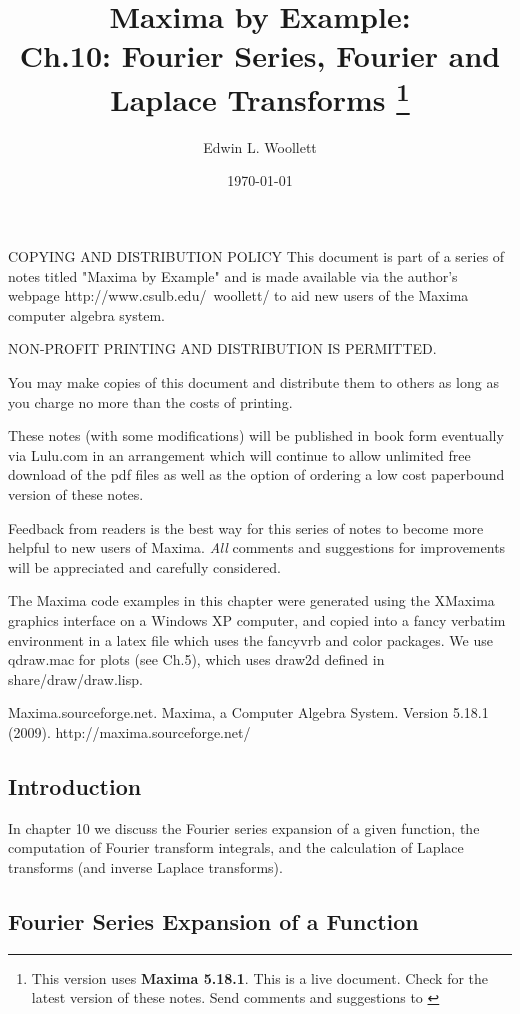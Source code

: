 \documentclass[12pt]{article}
\title{  Maxima by Example:\\ Ch.10: Fourier Series, Fourier and Laplace Transforms
            \thanks{This version uses \textbf{Maxima 5.18.1}. This is a live
            document. Check \; \textbf{ \tedhome } \; for the latest version of these notes. Send comments and
			 suggestions to \textbf{\tedmail} } }
\author{ Edwin L. Woollett}
\date{\today}
\newcommand{\tcdb}{\textcolor{mdb}}
\newcommand{\tcbr}{\textcolor{BrickRed}}
\begin{document}
%
\maketitle
\tableofcontents
{}
\newpage
\begin{myVerbatim2} 
COPYING AND DISTRIBUTION POLICY    
This document is part of a series of notes titled
"Maxima by Example" and is made available
via the author's webpage http://www.csulb.edu/~woollett/
to aid new users of the Maxima computer algebra system.	
	
NON-PROFIT PRINTING AND DISTRIBUTION IS PERMITTED.
	
You may make copies of this document and distribute them
to others as long as you charge no more than the costs of printing.	

These notes (with some modifications) will be published in book form
eventually via Lulu.com in an arrangement which will continue
to allow unlimited free download of the pdf files as well as the option
of ordering a low cost paperbound version of these notes.
\end{myVerbatim2}	
\smallskip
\noindent \tcbr{Feedback from readers is the best way for this series of notes
  to become more helpful to new users of Maxima}.
\tcdb{\emph{All} comments and suggestions for improvements will be appreciated and
  carefully considered}.
\smallskip
\begin{myVerbatim2s}
The Maxima code examples in this chapter were generated 
using the XMaxima graphics interface on a Windows XP computer, and copied
into a fancy verbatim environment in a latex file which uses the fancyvrb
and color packages.
We use qdraw.mac for plots (see Ch.5), which uses draw2d defined
in share/draw/draw.lisp.
\end{myVerbatim2s}  
\smallskip
\begin{myVerbatim}
Maxima.sourceforge.net. Maxima, a Computer Algebra System. Version 5.18.1
 (2009). http://maxima.sourceforge.net/
\end{myVerbatim}
\newpage
\setcounter{section}{10}
\subsection{Introduction}
In chapter 10 we discuss the Fourier series expansion of a given function, the
  computation of Fourier transform integrals, and the calculation
  of Laplace transforms (and inverse Laplace transforms).
\subsection{Fourier Series Expansion of a Function}
\end{document}
